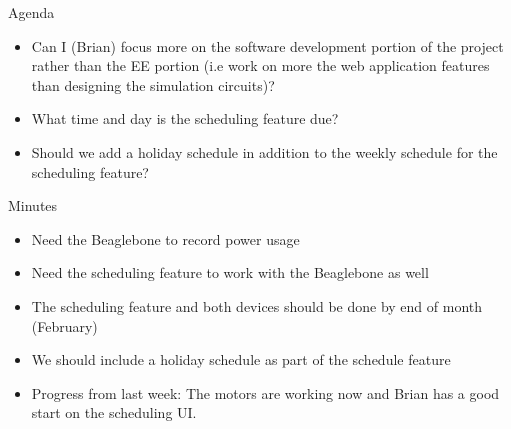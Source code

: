 \documentclass[fontsize=11pt, %
                             paper=letter, %
                             openany, %
                             captions=tableheading,
                             index=totoc,
                             hyperref]{labbook}
\begin{document}
Agenda
\begin{itemize}
\item Can I (Brian) focus more on the software development portion of the project rather than the EE portion (i.e work on more the web application features than designing the simulation circuits)?
\item What time and day is the scheduling feature due?
\item Should we add a holiday schedule in addition to the weekly schedule for the scheduling feature?
\end{itemize}
Minutes
\begin{itemize}
\item Need the Beaglebone to record power usage
\item Need the scheduling feature to work with the Beaglebone as well
\item The scheduling feature and both devices should be done by end of month (February)
\item We should include a holiday schedule as part of the schedule feature
\item Progress from last week: The motors are working now and Brian has a good start on the scheduling UI.
\end{itemize}
\end{document}

